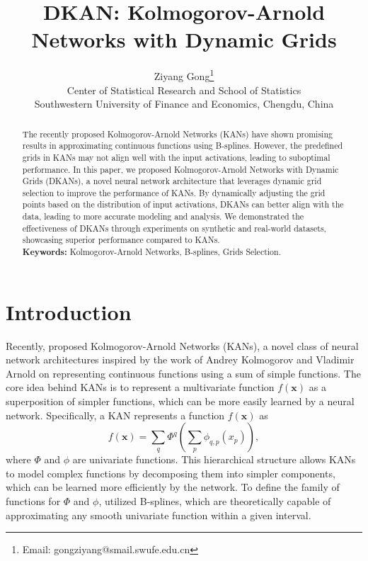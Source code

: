 \documentclass[11pt]{scrartcl}
\title{DKAN: Kolmogorov-Arnold Networks with Dynamic Grids}
\author{
	Ziyang Gong\thanks{Email: gongziyang@smail.swufe.edu.cn} \\
Center of Statistical Research and School of Statistics\\
 Southwestern University of Finance and Economics, Chengdu, China
}
\date{}
\begin{document}
\maketitle

\begin{abstract}
	The recently proposed Kolmogorov-Arnold Networks (KANs) have shown promising results in approximating continuous functions using B-splines. However, the predefined grids in KANs may not align well with the input activations, leading to suboptimal performance. In this paper, we proposed Kolmogorov-Arnold Networks with Dynamic Grids (DKANs), a novel neural network architecture that leverages dynamic grid selection to improve the performance of KANs. By dynamically adjusting the grid points based on the distribution of input activations, DKANs can better align with the data, leading to more accurate modeling and analysis. We demonstrated the effectiveness of DKANs through experiments on synthetic and real-world datasets, showcasing superior performance compared to KANs.\\
	\textbf{Keywords:} Kolmogorov-Arnold Networks, B-splines, Grids Selection.
\end{abstract}

\section{Introduction}

Recently, \citet{liu2024kan} proposed Kolmogorov-Arnold Networks (KANs), a novel class of neural network architectures inspired by the work of Andrey Kolmogorov and Vladimir Arnold on representing continuous functions using a sum of simple functions. The core idea behind KANs is to represent a multivariate function $f(\mathbf{x})$ as a superposition of simpler functions, which can be more easily learned by a neural network. Specifically, a KAN represents a function $f(\mathbf{x})$ as
\begin{equation}
	f(\mathbf{x}) = \sum_{q} \Phi^{q}\left(\sum_{p} \phi_{q,p}\left(x_{p}\right)\right),
\end{equation}
where $\Phi$ and $\phi$ are univariate functions. This hierarchical structure allows KANs to model complex functions by decomposing them into simpler components, which can be learned more efficiently by the network.
To define the family of functions for $\Phi$ and $\phi$, \citet{liu2024kan} utilized B-splines, which are theoretically capable of approximating any smooth univariate function within a given interval.
\end{document}
